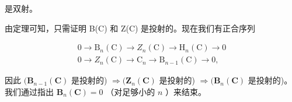 是双射。

由定理可知，只需证明 B(C) 和 Z(C) 是投射的。现在我们有正合序列

\[
\begin{array}{l} 0 \to \mathrm{B} _ {n} (\mathrm{C}) \to Z _ {n} (\mathrm{C}) \to \mathrm{H} _ {n} (\mathrm{C}) \to 0 \\ 0 \to Z _ {n} (\mathrm{C}) \to \mathrm{C} _ {n} \to \mathrm{B} _ {n - 1} (\mathrm{C}) \to 0, \end{array}
\]

因此 \((\mathbf{B}_{n - 1}(\mathbf{C})\) 是投射的) \(\Rightarrow (\mathbf{Z}_n(\mathbf{C})\) 是投射的) \(\Rightarrow (\mathbf{B}_n(\mathbf{C})\) 是投射的)。我们通过指出 \(\mathbf{B}_n(\mathbf{C}) = 0\) （对足够小的 \(n\) ）来结束。

